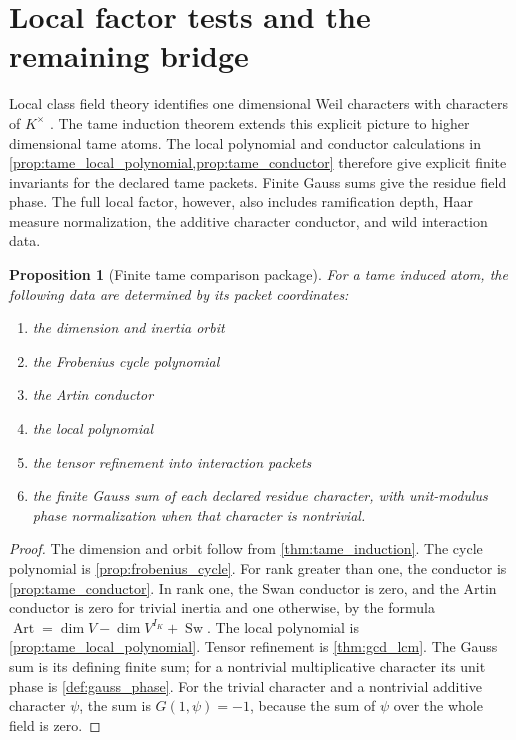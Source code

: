 \documentclass[11pt]{amsart}
\newtheorem{proposition}[proposition]{Proposition}
\theoremstyle{definition}
\theoremstyle{remark}
\begin{document}
\section{Local factor tests and the remaining bridge}\label{sec:boundary}

Local class field theory identifies one dimensional Weil characters with characters of \(K^{\times}\) \cite{Serre1967,Tate1979}. The tame induction theorem extends this explicit picture to higher dimensional tame atoms. The local polynomial and conductor calculations in \cref{prop:tame_local_polynomial,prop:tame_conductor} therefore give explicit finite invariants for the declared tame packets. Finite Gauss sums give the residue field phase. The full local factor, however, also includes ramification depth, Haar measure normalization, the additive character conductor, and wild interaction data.

\begin{proposition}[Finite tame comparison package]\label{prop:tame_package}
For a tame induced atom, the following data are determined by its packet coordinates:

\begin{enumerate}
\item the dimension and inertia orbit
\item the Frobenius cycle polynomial
\item the Artin conductor
\item the local polynomial
\item the tensor refinement into interaction packets
\item the finite Gauss sum of each declared residue character, with unit-modulus phase normalization when that character is nontrivial.
\end{enumerate}
\end{proposition}

\begin{proof}
The dimension and orbit follow from \cref{thm:tame_induction}. The cycle polynomial is \cref{prop:frobenius_cycle}. For rank greater than one, the conductor is \cref{prop:tame_conductor}. In rank one, the Swan conductor is zero, and the Artin conductor is zero for trivial inertia and one otherwise, by the formula \(\operatorname{Art}=\dim V-\dim V^{I_K}+\operatorname{Sw}\). The local polynomial is \cref{prop:tame_local_polynomial}. Tensor refinement is \cref{thm:gcd_lcm}. The Gauss sum is its defining finite sum; for a nontrivial multiplicative character its unit phase is \cref{def:gauss_phase}. For the trivial character and a nontrivial additive character \(\psi\), the sum is \(G(1,\psi)=-1\), because the sum of \(\psi\) over the whole field is zero.
\end{proof}
\end{document}
